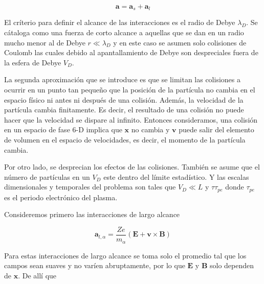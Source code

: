 \begin{equation*}
  \textbf{a} = \textbf{a}_s + \textbf{a}_l
\end{equation*}

El cr\'iterio para definir el alcance de las interacciones es el radio de Debye $\lambda_D$. Se c\'ataloga como una fuerza de corto alcance a aquellas que se dan en un radio mucho menor al de Debye $r \ll \lambda_D$ y en este caso se asumen solo colisiones de Coulomb las cuales debido al apantallamiento de Debye son despreciales fuera de la esfera de Debye $V_D$. 

La segunda aproximaci\'on que se introduce es que se limitan las colisiones a ocurrir en un punto tan pequeño que la posici\'on de la part\'icula no cambia en el espacio f\'isico ni antes ni despu\'es de una colisi\'on. Adem\'as, la velocidad de la part\'icula cambia finitamente. Es decir, el resultado de una colisi\'on no puede hacer que la velocidad se dispare al infinito. Entonces consideramos, una colisi\'on en un espacio de fase 6-D implica que $\textbf{x}$ no cambia y $\textbf{v}$ puede salir del elemento de volumen en el espacio de velocidades, es decir, el momento de la part\'icula cambia. 

Por otro lado, se desprecian los efectos de las colisiones. Tambi\'en se asume que el n\'umero de part\'iculas en un $V_D$ este dentro del l\'imite estad\'istico. Y las escalas dimensionales y temporales del problema son tales que $V_D \ll L$ y $\tau \tau_{pe}$ donde $\tau_{pe}$ es el periodo electr\'onico del plasma. 

Consideremos primero las interacciones de largo alcance

\begin{equation*}
  \textbf{a}_{l,\alpha} = \frac{Ze}{m_\alpha}(\textbf{E} + \textbf{v}\times\textbf{B})
\end{equation*}

Para estas interacciones de largo alcance se toma solo el promedio tal que los campos sean suaves y no var\'ien abruptamente, por lo que $\textbf{E}$ y $\textbf{B}$ solo dependen de $\textbf{x}$. De all\'i que

